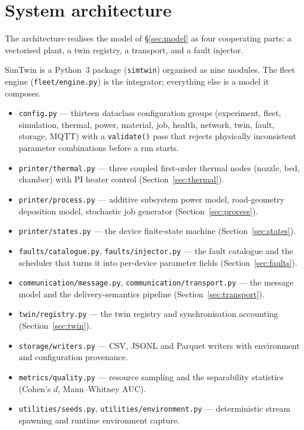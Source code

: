 \documentclass[preprint,12pt,authoryear,nopreprintline]{elsarticle}
\newcommand{\smt}{SimTwin}
\begin{document}
\section{System architecture}
\label{sec:architecture}
The architecture realises the model of \S\ref{sec:model} as four cooperating
parts: a vectorised plant, a twin registry, a transport, and a fault injector.

\smt{} is a Python~3 package (\texttt{simtwin}) organised as nine modules.
The fleet engine (\texttt{fleet/engine.py}) is the integrator; everything else is
a model it composes.

\begin{itemize}
  \item \texttt{config.py} --- thirteen dataclass configuration groups
        (experiment, fleet, simulation, thermal, power, material, job, health,
        network, twin, fault, storage, MQTT) with a \texttt{validate()} pass that
        rejects physically inconsistent parameter combinations before a run
        starts.
  \item \texttt{printer/thermal.py} --- three coupled first-order thermal nodes
        (nozzle, bed, chamber) with PI heater control (Section~\ref{sec:thermal}).
  \item \texttt{printer/process.py} --- additive subsystem power model,
        road-geometry deposition model, stochastic job generator
        (Section~\ref{sec:process}).
  \item \texttt{printer/states.py} --- the device finite-state machine
        (Section~\ref{sec:states}).
  \item \texttt{faults/catalogue.py}, \texttt{faults/injector.py} --- the fault
        catalogue and the scheduler that turns it into per-device parameter
        fields (Section~\ref{sec:faults}).
  \item \texttt{communication/message.py}, \texttt{communication/transport.py}
        --- the message model and the delivery-semantics pipeline
        (Section~\ref{sec:transport}).
  \item \texttt{twin/registry.py} --- the twin registry and synchronisation
        accounting (Section~\ref{sec:twin}).
  \item \texttt{storage/writers.py} --- CSV, JSONL and Parquet writers with
        environment and configuration provenance.
  \item \texttt{metrics/quality.py} --- resource sampling and the separability
        statistics (Cohen's $d$, Mann--Whitney AUC).
  \item \texttt{utilities/seeds.py}, \texttt{utilities/environment.py} ---
        deterministic stream spawning and runtime environment capture.
\end{itemize}
\end{document}
